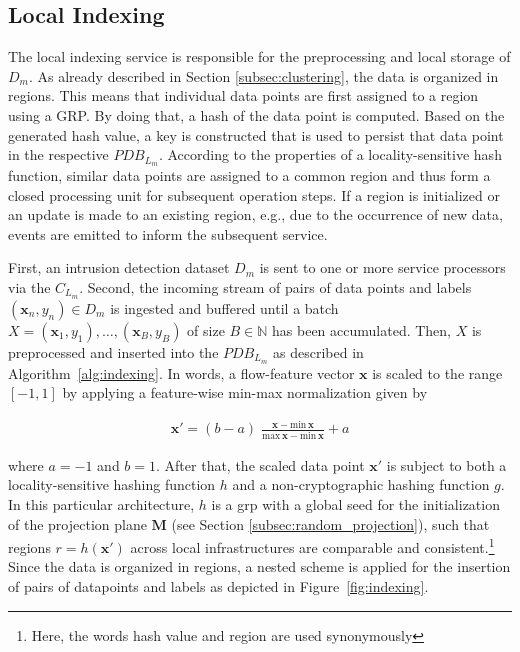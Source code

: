 \documentclass[../../main.tex]{subfiles}
\begin{document}
\subsection{Local Indexing} \label{sec:local_indexing}

The local indexing service is responsible for the preprocessing and local storage of $D_m$. As already described in Section \ref{subsec:clustering}, the data is organized in regions. This means that individual data points are first assigned to a region using a GRP. By doing that, a hash of the data point is computed. Based on the generated hash value, a key is constructed that is used to persist that data point in the respective $PDB_{L_m}$. According to the properties of a locality-sensitive hash function, similar data points are assigned to a common region and thus form a closed processing unit for subsequent operation steps. If a region is initialized or an update is made to an existing region, e.g., due to the occurrence of new data, events are emitted to inform the subsequent service. 

 First, an intrusion detection dataset $D_m$ is sent to one or more service processors via the $C_{L_m}$. Second, the incoming stream of pairs of data points and labels $(\bm{x}_n, y_n) \in D_m$ is ingested and buffered until a batch $X=(\bm{x}_1, y_1), \dots, (\bm{x}_B, y_B)$ of size $B \in \mathbb{N}$ has been accumulated. Then, $X$ is preprocessed and inserted into the $PDB_{L_m}$ as described in Algorithm~\ref{alg:indexing}. In words, a flow-feature vector $\bm{x}$ is scaled to the range $[-1, 1]$ by applying a feature-wise min-max normalization given by

\begin{align}\label{eq:normalization}
    \bm{x}' = (b-a) \; \frac{\bm{x} - \text{min}\,\bm{x}}{\text{max}\,\bm{x} - \text{min}\,\bm{x}} + a
\end{align}

where $a=-1$ and $b=1$. After that, the scaled data point $\bm{x}'$ is subject to both a locality-sensitive hashing function $h$ and a non-cryptographic hashing function $g$. In this particular architecture, $h$ is a \gls{grp} with a global seed for the initialization of the projection plane $\bm{M}$ (see Section \ref{subsec:random_projection}), such that regions $r = h(\bm{x}')$ across local infrastructures are comparable and consistent.\footnote{Here, the words hash value and region are used synonymously} Since the data is organized in regions, a nested scheme is applied for the insertion of pairs of datapoints and labels as depicted in Figure~\ref{fig:indexing}. 
\end{document}
